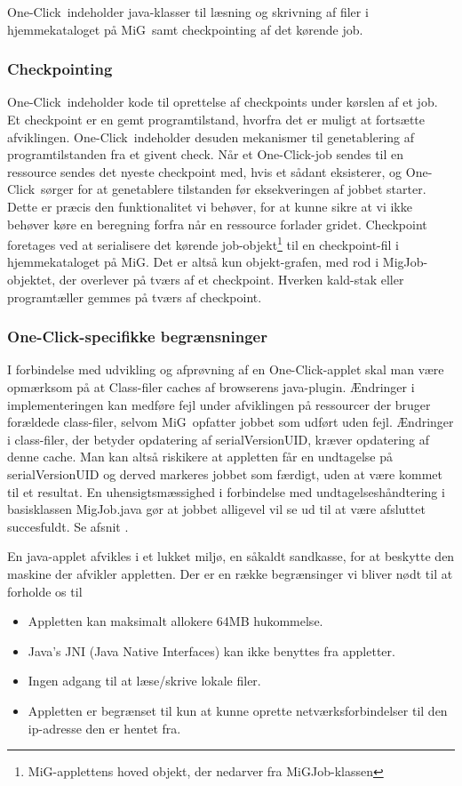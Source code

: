 \documentclass[pdf,draft,a4paper,11pt]{article}
\newcommand{\mig}{MiG}
\newcommand{\oc}{One-Click}
\begin{document}
\oc\ indeholder java-klasser til læsning og skrivning af filer i hjemmekataloget på \mig\, samt checkpointing af det kørende job. 

\subsubsection{Checkpointing}
\oc\ indeholder kode til oprettelse af checkpoints under kørslen af et job. Et checkpoint er en gemt programtilstand, hvorfra det er muligt at fortsætte afviklingen. \oc\ indeholder desuden mekanismer til genetablering af programtilstanden fra et givent check. Når et \oc-job sendes til en ressource sendes det nyeste checkpoint med, hvis et sådant eksisterer, og \oc\ sørger for at genetablere tilstanden før eksekveringen af jobbet starter. Dette er præcis den funktionalitet vi behøver, for at kunne sikre at vi ikke behøver køre en beregning forfra når en ressource forlader gridet.
Checkpoint foretages ved at serialisere det kørende job-objekt\footnote{\mig-applettens hoved objekt, der nedarver fra MiGJob-klassen} til en checkpoint-fil i hjemmekataloget på \mig. Det er altså kun objekt-grafen, med rod i MigJob-objektet, der overlever på tværs af et checkpoint. Hverken kald-stak eller programtæller gemmes på tværs af checkpoint.

\subsubsection{\oc-specifikke begrænsninger}

I forbindelse med udvikling og afprøvning af en \oc-applet skal man være
opmærksom på at Class-filer caches af browserens java-plugin. Ændringer i
implementeringen kan medføre fejl under afviklingen på ressourcer der bruger
forældede class-filer, selvom \mig\ opfatter jobbet som udført uden fejl. Ændringer i class-filer, der betyder opdatering af serialVersionUID, kræver opdatering af denne cache. Man kan altså riskikere at appletten får en undtagelse på serialVersionUID og derved markeres jobbet som færdigt, uden at være kommet til et resultat. En uhensigtsmæssighed i forbindelse med undtagelseshåndtering i basisklassen MigJob.java gør at jobbet alligevel vil se ud til at være afsluttet succesfuldt. Se afsnit \cite{forbedringer}. 

En java-applet afvikles i et lukket miljø, en såkaldt sandkasse, for at beskytte den maskine der afvikler appletten. Der er en række begrænsinger vi bliver nødt til at forholde os til
\begin{itemize}
	\item Appletten kan maksimalt allokere 64MB hukommelse.
	\item Java's JNI (Java Native Interfaces) kan ikke benyttes fra appletter. 
	\item Ingen adgang til at læse/skrive lokale filer.
	\item Appletten er begrænset til kun at kunne oprette netværksforbindelser til den ip-adresse den er hentet fra.
\end{itemize}
\end{document}
